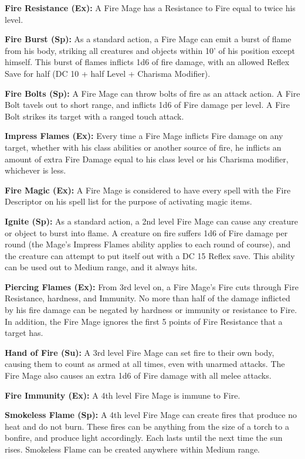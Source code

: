 \textbf{Fire Resistance (Ex):} A Fire Mage has a Resistance to Fire equal to twice his level.

\textbf{Fire Burst (Sp):} As a standard action, a Fire Mage can emit a burst of flame from his body, striking all creatures and objects within 10' of his position except himself. This burst of flames inflicts 1d6 of fire damage, with an allowed Reflex Save for half (DC 10 + half Level + Charisma Modifier).

\textbf{Fire Bolts (Sp):} A Fire Mage can throw bolts of fire as an attack action. A Fire Bolt tavels out to short range, and inflicts 1d6 of Fire damage per level. A Fire Bolt strikes its target with a ranged touch attack.

\textbf{Impress Flames (Ex):} Every time a Fire Mage inflicts Fire damage on any target, whether with his class abilities or another source of fire, he inflicts an amount of extra Fire Damage equal to his class level or his Charisma modifier, whichever is less.

\textbf{Fire Magic (Ex):} A Fire Mage is considered to have every spell with the Fire Descriptor on his spell list for the purpose of activating magic items.

\textbf{Ignite (Sp):} As a standard action, a 2nd level Fire Mage can cause any creature or object to burst into flame. A creature on fire suffers 1d6 of Fire damage per round (the Mage's Impress Flames ability applies to each round of course), and the creature can attempt to put itself out with a DC 15 Reflex save. This ability can be used out to Medium range, and it always hits.

\textbf{Piercing Flames (Ex):} From 3rd level on, a Fire Mage's Fire cuts through Fire Resistance, hardness, and Immunity. No more than half of the damage inflicted by his fire damage can be negated by hardness or immunity or resistance to Fire. In addition, the Fire Mage ignores the first 5 points of Fire Resistance that a target has.

\textbf{Hand of Fire (Su):} A 3rd level Fire Mage can set fire to their own body, causing them to count as armed at all times, even with unarmed attacks. The Fire Mage also causes an extra 1d6 of Fire damage with all melee attacks.

\textbf{Fire Immunity (Ex):} A 4th level Fire Mage is immune to Fire.

\textbf{Smokeless Flame (Sp):} A 4th level Fire Mage can create fires that produce no heat and do not burn. These fires can be anything from the size of a torch to a bonfire, and produce light accordingly. Each lasts until the next time the sun rises. Smokeless Flame can be created anywhere within Medium range.

